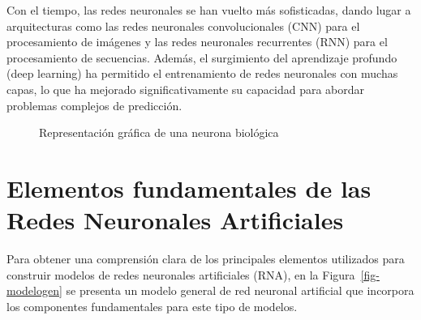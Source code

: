 \documentclass[
  us-letterpaper,
]{scrreprt}
\theoremstyle{definition}
\theoremstyle{plain}
\theoremstyle{plain}
\theoremstyle{definition}
\theoremstyle{remark}
\begin{document}
Con el tiempo, las redes neuronales se han vuelto más sofisticadas,
dando lugar a arquitecturas como las redes neuronales convolucionales
(CNN) para el procesamiento de imágenes y las redes neuronales
recurrentes (RNN) para el procesamiento de secuencias. Además, el
surgimiento del aprendizaje profundo (deep learning) ha permitido el
entrenamiento de redes neuronales con muchas capas, lo que ha mejorado
significativamente su capacidad para abordar problemas complejos de
predicción.

\begin{figure}


\caption{\label{fig-neubio}Representación gráfica de una neurona
biológica}

\end{figure}%

\section{Elementos fundamentales de las Redes Neuronales
Artificiales}\label{elementos-fundamentales-de-las-redes-neuronales-artificiales}

Para obtener una comprensión clara de los principales elementos
utilizados para construir modelos de redes neuronales artificiales
(RNA), en la Figura~\ref{fig-modelogen} se presenta un modelo general de
red neuronal artificial que incorpora los componentes fundamentales para
este tipo de modelos.
\end{document}
